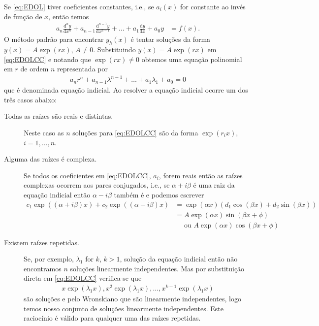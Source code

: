 \documentclass[a4paper,12pt, leqno, answers]{exam}
\begin{document}
Se \eqref{eq:EDOL} tiver coeficientes constantes, i.e., se $a_i(x)$ for constante ao inv\'{e}s de fun\c{c}\~{a}o de $x$, ent\~{a}o temos
\begin{align*}
    a_n \frac{\mathrm{d}^ny}{\mathrm{d}x^n} + a_{n - 1} \frac{\mathrm{d}^{n - 1}y}{\mathrm{d}x^{n - 1}} + \ldots + a_1 \frac{\mathrm{d}y}{\mathrm{d}x} + a_0 y &= f(x). \tag{EDOLCC} \label{eq:EDOLCC}
\end{align*}
O m\'{e}todo padr\~{a}o para encontrar $y_h(x)$ \'{e} tentar solu\c{c}\~{o}es da forma $y(x) = A \exp(r x)$, $A \neq 0$. Substituindo $y(x) = A \exp(r x)$ em \eqref{eq:EDOLCC} e notando que $\exp(r x) \neq 0$ obtemos uma equa\c{c}\~{a}o polinomial em $r$ de ordem $n$ representada por
\begin{align*}
    a_n r^n + a_{n - 1} \lambda^{n - 1} + \ldots + a_1 \lambda_1 + a_0 = 0
\end{align*}
que \'{e} denominada equa\c{c}\~{a}o indicial. Ao resolver a equa\c{c}\~{a}o indicial ocorre um dos tr\^{e}s casos abaixo:
\begin{description}
    \item[Todas as ra\'{i}zes s\~{a}o reais e distintas.] Neste caso as $n$ solu\c{c}\~{o}es para \eqref{eq:EDOLCC} s\~{a}o da forma $\exp(r_i x)$, $i = 1, \ldots, n$.
    \item[Alguma das ra\'{i}zes \'{e} complexa.] Se todos os coeficientes em \eqref{eq:EDOLCC}, $a_i$, forem reais ent\~{a}o as ra\'{i}zes complexas ocorrem aos pares conjugados, i.e., se $\alpha + i \beta$ \'{e} uma raiz da equa\c{c}\~{a}o indicial ent\~{a}o $\alpha - i \beta$ tamb\'{e}m \'{e} e podemos escrever
        \begin{align*}
            c_1 \exp\left( (\alpha + i \beta) x \right) + c_2 \exp\left( (\alpha - i \beta) x \right) &= \exp(\alpha x) \left( d_1 \cos(\beta x) + d_2 \sin(\beta x) \right) \\
            &= A \exp(\alpha x) \sin(\beta x + \phi) \\
            &\quad \text{ ou } A \exp(\alpha x) \cos(\beta x + \phi)
        \end{align*}
    \item[Existem ra\'{i}zes repetidas.] Se, por exemplo, $\lambda_1$ for $k$, $k > 1$, solu\c{c}\~{a}o da equa\c{c}\~{a}o indicial ent\~{a}o n\~{a}o encontramos $n$ solu\c{c}\~{o}es linearmente independentes. Mas por substitui\c{c}\~{a}o direta em \eqref{eq:EDOLCC} verifica-se que
        \begin{align*}
            x \exp(\lambda_1 x), x^2 \exp(\lambda_1 x), \ldots, x^{k - 1} \exp(\lambda_1 x)
        \end{align*}
        s\~{a}o solu\c{c}\~{o}es e pelo Wronskiano que s\~{a}o linearmente independentes, logo temos nosso conjunto de solu\c{c}\~{o}es linearmente independentes. Este racioc\'{i}nio \'{e} v\'{a}lido para qualquer uma das ra\'{i}zes repetidas.
\end{description}
\end{document}
